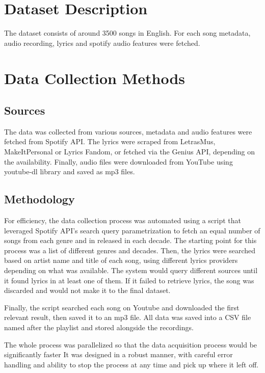 \section{Dataset Description}
\label{sec:datasetdescription}

The dataset consists of around 3500 songs in English. For each song metadata, audio
recording, lyrics and spotify audio features were fetched.

\section{Data Collection Methods}
\label{sec:datacollectionmethods}

\subsection{Sources}
The data was collected from various sources, metadata and audio features were fetched from
Spotify API. The lyrics were scraped from LetrasMus, MakeItPersonal or Lyrics Fandom, or
fetched via the Genius API, depending on the availability. Finally, audio files were downloaded from YouTube using youtube-dl library and saved as mp3 files.\cite{spotify_api} \cite{makeitpersonal} \cite{genius} \cite{letras_mus} \cite{lyricsfandom} \cite{ytdl} 

\subsection{Methodology}
For efficiency, the data collection process was automated using a script that leveraged Spotify API’s search query parametrization to fetch an equal number of songs from each genre and in released in each decade. The starting point for this process was a list of different genres and decades. Then, the lyrics were searched based on artist name and title of each song, using different lyrics providers depending on what was available. The system would query different sources until it found lyrics in at least one of them. If it failed to retrieve lyrics, the song was discarded and would not make it to the final dataset.


Finally, the script searched each song on Youtube  and downloaded the first relevant result, then saved it to an mp3 file. All data was saved into a CSV file named after the playlist and stored alongside the recordings. 

The whole process was parallelized so that the data acquisition process would be significantly faster It was designed in a robust manner, with careful error handling and ability to stop the process at any time and pick up where it left off.

